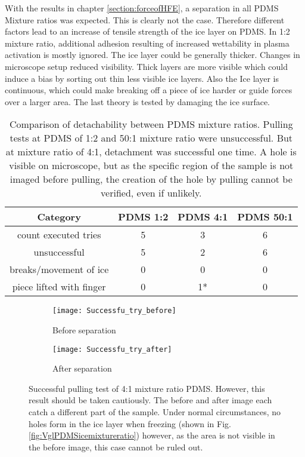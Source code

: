 With the results in chapter \ref{section:forceofHFE}, a separation in all PDMS Mixture ratios was expected. This is clearly not the case. Therefore different factors lead to an increase of tensile strength of the ice layer on PDMS. In 1:2 mixture ratio, additional adhesion resulting of increased wettability in plasma activation is mostly ignored. The ice layer could be generally thicker. Changes in microscope setup reduced visibility. Thick layers are more visible which could induce a bias by sorting out thin less visible ice layers. Also the Ice layer is continuous, which could make breaking off a piece of ice harder or guide forces over a larger area. The last theory is tested by damaging the ice surface.


\begin{table}
	\centering
	\begin{tabular}{|c|c|c|c|}
		\hline
		Category & PDMS 1:2 & PDMS 4:1 & PDMS 50:1 \\
		\hline
		\hline
		count executed tries & 5 & 3 & 6\\
		\hline
		unsuccessful & 5 & 2 & 6\\
		\hline
		breaks/movement of ice & 0 & 0 & 0\\
		\hline
		piece lifted with finger & 0 & 1* & 0\\
		\hline		
	\end{tabular}
	\caption{Comparison of detachability between PDMS mixture ratios. Pulling tests at PDMS of 1:2 and 50:1 mixture ratio were unsuccessful. But at mixture ratio of 4:1, detachment was successful one time. A hole is visible on microscope, but as the specific region of the sample is not imaged before pulling, the creation of the hole by pulling cannot be verified, even if unlikely.}
	\label{table:AttemptsPDMS}
\end{table}


\begin{figure}[hbt!]
	\centering
	\begin{subfigure}[]{0.45\textwidth}
		\centering
		\texttt{[image: Successfu\_try\_before]}
		\caption{Before separation}
	\end{subfigure}
	\begin{subfigure}[]{0.45\textwidth}
		\centering
		\texttt{[image: Successfu\_try\_after]}
		\caption{After separation}
	\end{subfigure}
	\caption{Successful pulling test of 4:1 mixture ratio PDMS. However, this result should be taken cautiously. The before and after image each catch a different part of the sample. Under normal circumstances, no holes form in the ice layer when freezing (shown in Fig. \ref{fig:VglPDMSicemixtureratio}) however, as the area is not visible in the before image, this case cannot be ruled out.}
	\label{fig:SuccessfulDetachment}
\end{figure}

